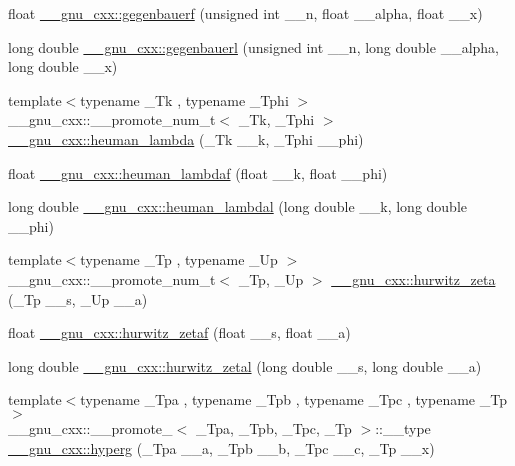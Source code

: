 \begin{DoxyCompactItemize}
\item 
float \hyperlink{group__gnu__math__spec__func_ga0f16dd9c771c8c177f377381b6e3387c}{\+\_\+\+\_\+gnu\+\_\+cxx\+::gegenbauerf} (unsigned int \+\_\+\+\_\+n, float \+\_\+\+\_\+alpha, float \+\_\+\+\_\+x)
\item 
long double \hyperlink{group__gnu__math__spec__func_gabf1644841deefbb162ade9fa508591cb}{\+\_\+\+\_\+gnu\+\_\+cxx\+::gegenbauerl} (unsigned int \+\_\+\+\_\+n, long double \+\_\+\+\_\+alpha, long double \+\_\+\+\_\+x)
\item 
{\footnotesize template$<$typename \+\_\+\+Tk , typename \+\_\+\+Tphi $>$ }\\\+\_\+\+\_\+gnu\+\_\+cxx\+::\+\_\+\+\_\+promote\+\_\+num\+\_\+t$<$ \+\_\+\+Tk, \+\_\+\+Tphi $>$ \hyperlink{group__gnu__math__spec__func_ga3b606d8617459ef7e5d340db1bae13ec}{\+\_\+\+\_\+gnu\+\_\+cxx\+::heuman\+\_\+lambda} (\+\_\+\+Tk \+\_\+\+\_\+k, \+\_\+\+Tphi \+\_\+\+\_\+phi)
\item 
float \hyperlink{group__gnu__math__spec__func_ga10cf5d54d985aa3a58cb197601040ac8}{\+\_\+\+\_\+gnu\+\_\+cxx\+::heuman\+\_\+lambdaf} (float \+\_\+\+\_\+k, float \+\_\+\+\_\+phi)
\item 
long double \hyperlink{group__gnu__math__spec__func_gadadaeb83b3d9c2fccd33ab8ec3188df5}{\+\_\+\+\_\+gnu\+\_\+cxx\+::heuman\+\_\+lambdal} (long double \+\_\+\+\_\+k, long double \+\_\+\+\_\+phi)
\item 
{\footnotesize template$<$typename \+\_\+\+Tp , typename \+\_\+\+Up $>$ }\\\+\_\+\+\_\+gnu\+\_\+cxx\+::\+\_\+\+\_\+promote\+\_\+num\+\_\+t$<$ \+\_\+\+Tp, \+\_\+\+Up $>$ \hyperlink{group__gnu__math__spec__func_gaed8e8bb0f1755fa7b0786d02ed574347}{\+\_\+\+\_\+gnu\+\_\+cxx\+::hurwitz\+\_\+zeta} (\+\_\+\+Tp \+\_\+\+\_\+s, \+\_\+\+Up \+\_\+\+\_\+a)
\item 
float \hyperlink{group__gnu__math__spec__func_gaa745d7f2edde060ed2f22817ad89df1f}{\+\_\+\+\_\+gnu\+\_\+cxx\+::hurwitz\+\_\+zetaf} (float \+\_\+\+\_\+s, float \+\_\+\+\_\+a)
\item 
long double \hyperlink{group__gnu__math__spec__func_gad8f2cfc7e198755968bae35d46b49d5a}{\+\_\+\+\_\+gnu\+\_\+cxx\+::hurwitz\+\_\+zetal} (long double \+\_\+\+\_\+s, long double \+\_\+\+\_\+a)
\item 
{\footnotesize template$<$typename \+\_\+\+Tpa , typename \+\_\+\+Tpb , typename \+\_\+\+Tpc , typename \+\_\+\+Tp $>$ }\\\+\_\+\+\_\+gnu\+\_\+cxx\+::\+\_\+\+\_\+promote\+\_$<$ \+\_\+\+Tpa, \+\_\+\+Tpb, \+\_\+\+Tpc, \+\_\+\+Tp $>$\+::\+\_\+\+\_\+type \hyperlink{group__gnu__math__spec__func_gaf52cf49736c63b0bb000be98b53c221f}{\+\_\+\+\_\+gnu\+\_\+cxx\+::hyperg} (\+\_\+\+Tpa \+\_\+\+\_\+a, \+\_\+\+Tpb \+\_\+\+\_\+b, \+\_\+\+Tpc \+\_\+\+\_\+c, \+\_\+\+Tp \+\_\+\+\_\+x)

\end{DoxyCompactItemize}
